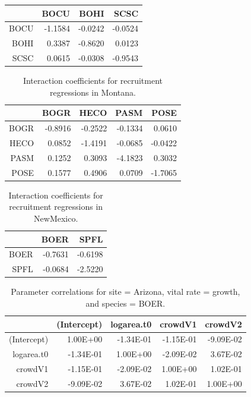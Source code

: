 \documentclass[12pt,]{article}
\begin{document}
\begin{table}[ht]
\begin{tabular}{rrrr}
  \hline
 & BOCU & BOHI & SCSC \\ 
  \hline
BOCU & -1.1584 & -0.0242 & -0.0524 \\ 
  BOHI & 0.3387 & -0.8620 & 0.0123 \\ 
  SCSC & 0.0615 & -0.0308 & -0.9543 \\ 
   \hline
\end{tabular}
\end{table}\begin{table}[ht]
\centering
\caption{Interaction coefficients for recruitment regressions in Montana.} 
\begin{tabular}{rrrrr}
  \hline
 & BOGR & HECO & PASM & POSE \\ 
  \hline
BOGR & -0.8916 & -0.2522 & -0.1334 & 0.0610 \\ 
  HECO & 0.0852 & -1.4191 & -0.0685 & -0.0422 \\ 
  PASM & 0.1252 & 0.3093 & -4.1823 & 0.3032 \\ 
  POSE & 0.1577 & 0.4906 & 0.0709 & -1.7065 \\ 
   \hline
\end{tabular}
\end{table}\begin{table}[ht]
\centering
\caption{Interaction coefficients for recruitment regressions in NewMexico.} 
\begin{tabular}{rrr}
  \hline
 & BOER & SPFL \\ 
  \hline
BOER & -0.7631 & -0.6198 \\ 
  SPFL & -0.0684 & -2.5220 \\ 
   \hline
\end{tabular}
\end{table}

\newpage{}

\begin{table}[ht]
\centering
\caption{Parameter correlations for site = Arizona, vital rate = growth, and species = BOER.} 
\begin{tabular}{rrrrr}
  \hline
 & (Intercept) & logarea.t0 & crowdV1 & crowdV2 \\ 
  \hline
(Intercept) & 1.00E+00 & -1.34E-01 & -1.15E-01 & -9.09E-02 \\ 
  logarea.t0 & -1.34E-01 & 1.00E+00 & -2.09E-02 & 3.67E-02 \\ 
  crowdV1 & -1.15E-01 & -2.09E-02 & 1.00E+00 & 1.02E-01 \\ 
  crowdV2 & -9.09E-02 & 3.67E-02 & 1.02E-01 & 1.00E+00 \\ 
   \hline
\end{tabular}
\end{table}
\end{document}
